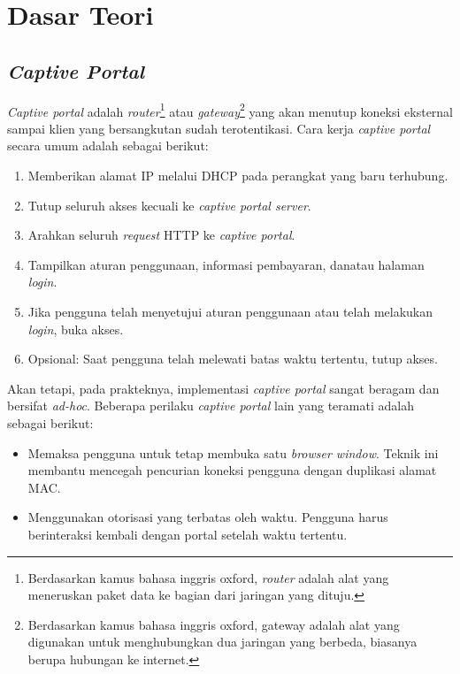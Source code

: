 \chapter{Dasar Teori}
\label{chap:dasar_teori}



\section{\textit{Captive Portal}}
\label{sec:captive_portal}

\textit{Captive portal} adalah \textit{router}\footnote{Berdasarkan kamus bahasa inggris oxford, \textit{router} adalah alat yang meneruskan paket data ke bagian dari jaringan yang dituju.} atau \textit{gateway}\footnote{Berdasarkan kamus bahasa inggris oxford, gateway adalah alat yang digunakan untuk menghubungkan dua jaringan yang berbeda, biasanya berupa hubungan ke internet.} yang akan menutup koneksi eksternal sampai klien yang bersangkutan sudah terotentikasi\cite{Potter:2002}. Cara kerja \textit{captive portal} secara umum adalah sebagai berikut:

\begin{enumerate}
    \item{Memberikan alamat IP melalui DHCP pada perangkat yang baru terhubung.}
    \item{Tutup seluruh akses kecuali ke \textit{captive portal server}.}
    \item{Arahkan seluruh \textit{request} HTTP ke \textit{captive portal}.}
    \item{Tampilkan aturan penggunaan, informasi pembayaran, dan\/atau halaman \textit{login}.}
    \item{Jika pengguna telah menyetujui aturan penggunaan atau telah melakukan \textit{login}, buka akses.}
    \item{Opsional: Saat pengguna telah melewati batas waktu tertentu, tutup akses.}
\end{enumerate}

Akan tetapi, pada prakteknya, implementasi \textit{captive portal} sangat beragam dan bersifat \textit{ad-hoc}\cite{HTTPWG_CP:2016}. Beberapa perilaku \textit{captive portal} lain yang teramati adalah sebagai berikut:

\begin{itemize}
    \item{Memaksa pengguna untuk tetap membuka satu \textit{browser window}. Teknik ini membantu mencegah pencurian koneksi pengguna dengan duplikasi alamat MAC.}
    \item{Menggunakan otorisasi yang terbatas oleh waktu. Pengguna harus berinteraksi kembali dengan portal setelah waktu tertentu.}
\end{itemize}

